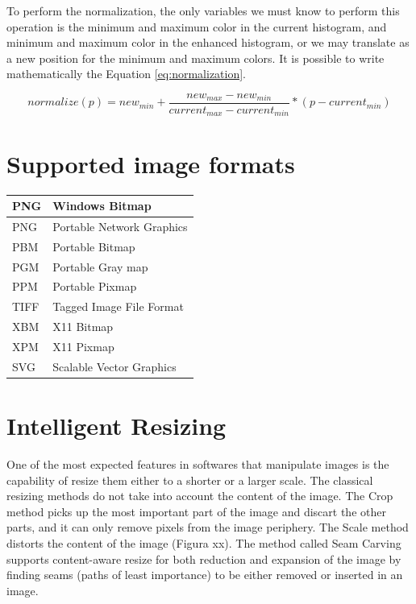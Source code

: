 \documentclass{article}
\begin{document}
		

		To perform the normalization, the only variables we must know to perform this operation is the minimum and maximum color in the current histogram, 
		and minimum and maximum color in the enhanced histogram, or we may translate as a new position for the minimum and maximum colors. It is possible
		to write mathematically the Equation \ref{eq:normalization}. \nocite{*}


		\begin{equation}
			normalize(p)=new_{min}+\frac{new_{max}-new_{min}}{current_{max}-current_{min}}*(p-current_{min})
			\label{eq:normalization}
		\end{equation}
		
\section{Supported image formats}


		\begin{center}
		    \begin{tabular}{ | l | l |}
		    \hline
		    	PNG & Windows Bitmap \\ \hline
			PNG & Portable Network Graphics\\ \hline
			PBM & Portable Bitmap\\ \hline
			PGM & Portable Gray map\\ \hline
			PPM & Portable Pixmap\\ \hline
			TIFF & Tagged Image File Format\\ \hline
			XBM & X11 Bitmap\\ \hline
			XPM & X11 Pixmap\\ \hline
			SVG & Scalable Vector Graphics\\ \hline
		    \end{tabular}
		\end{center}

\section{Intelligent Resizing}

	One of the most expected features in softwares that manipulate images is the capability of resize them either to a shorter or a larger scale. The classical resizing methods do not take into account the content of the image. The Crop method picks up the most important part of the image and discart the other parts, and it can only remove pixels from the image periphery. The Scale method distorts the content of the image (Figura xx). The method called Seam Carving supports content-aware resize for both reduction and expansion of the image by finding seams (paths of least importance) to be either removed or inserted in an image.
\end{document}
